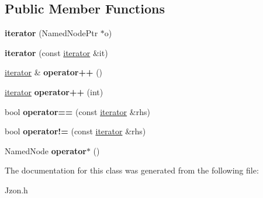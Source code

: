 \subsection*{Public Member Functions}
\begin{DoxyCompactItemize}
\item 
\hypertarget{class_jzon_1_1_object_1_1iterator_ae5375ba11d0b1187146b3ac2dc74ec4c}{{\bfseries iterator} (Named\-Node\-Ptr $\ast$o)}\label{class_jzon_1_1_object_1_1iterator_ae5375ba11d0b1187146b3ac2dc74ec4c}

\item 
\hypertarget{class_jzon_1_1_object_1_1iterator_a164a528008096a59aa79b064e4b25110}{{\bfseries iterator} (const \hyperlink{class_jzon_1_1_object_1_1iterator}{iterator} \&it)}\label{class_jzon_1_1_object_1_1iterator_a164a528008096a59aa79b064e4b25110}

\item 
\hypertarget{class_jzon_1_1_object_1_1iterator_a1cc1676ac46b9d4d8cd6b2718be44d72}{\hyperlink{class_jzon_1_1_object_1_1iterator}{iterator} \& {\bfseries operator++} ()}\label{class_jzon_1_1_object_1_1iterator_a1cc1676ac46b9d4d8cd6b2718be44d72}

\item 
\hypertarget{class_jzon_1_1_object_1_1iterator_a63af275b51285d745dff3f97a0c3cd21}{\hyperlink{class_jzon_1_1_object_1_1iterator}{iterator} {\bfseries operator++} (int)}\label{class_jzon_1_1_object_1_1iterator_a63af275b51285d745dff3f97a0c3cd21}

\item 
\hypertarget{class_jzon_1_1_object_1_1iterator_a488024d8bb61e4efb256c82df4dd84bb}{bool {\bfseries operator==} (const \hyperlink{class_jzon_1_1_object_1_1iterator}{iterator} \&rhs)}\label{class_jzon_1_1_object_1_1iterator_a488024d8bb61e4efb256c82df4dd84bb}

\item 
\hypertarget{class_jzon_1_1_object_1_1iterator_a1c2f2b385ccf8f5a12890d8c43b6d742}{bool {\bfseries operator!=} (const \hyperlink{class_jzon_1_1_object_1_1iterator}{iterator} \&rhs)}\label{class_jzon_1_1_object_1_1iterator_a1c2f2b385ccf8f5a12890d8c43b6d742}

\item 
\hypertarget{class_jzon_1_1_object_1_1iterator_a8117c0c505cf83596e45e71080b71818}{Named\-Node {\bfseries operator$\ast$} ()}\label{class_jzon_1_1_object_1_1iterator_a8117c0c505cf83596e45e71080b71818}

\end{DoxyCompactItemize}


The documentation for this class was generated from the following file\-:\begin{DoxyCompactItemize}
\item 
Jzon.\-h\end{DoxyCompactItemize}
